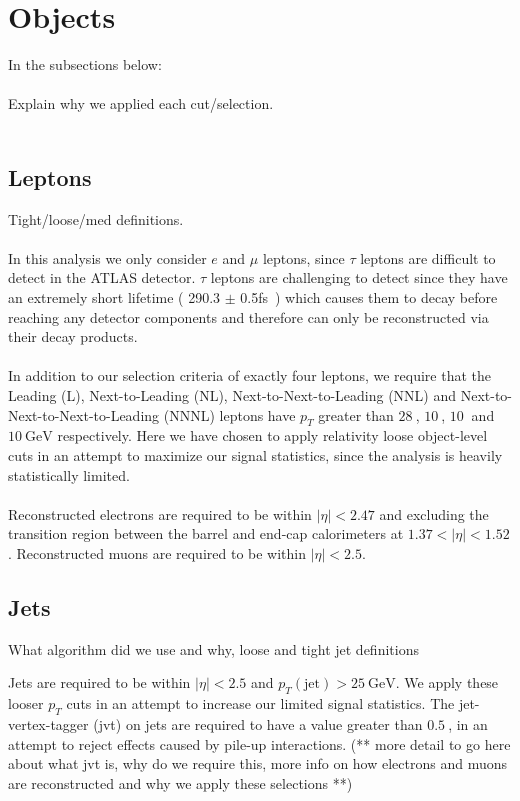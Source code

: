 \section{Objects}
In the subsections below:\\\\
Explain why we applied each cut/selection.\\\\


\subsection{Leptons}
Tight/loose/med definitions.\\\\

In this analysis we only consider $e$ and $\mu$ leptons, since $\tau$ leptons are difficult to detect in the ATLAS detector. $\tau$ leptons are challenging to detect since they have an extremely short lifetime ( 290.3 $\pm$ 0.5fs~\cite{pdg}) which causes them to decay before reaching any detector components and therefore can only be reconstructed via their decay products.\\\\
In addition to our selection criteria of exactly four leptons, we require that the Leading (L), Next-to-Leading (NL), Next-to-Next-to-Leading (NNL) and Next-to-Next-to-Next-to-Leading (NNNL) leptons have $p_{T}$ greater than $\SI{28}{}$, $\SI{10}{}$, $\SI{10}{}$ and $\SI{10}{\GeV}$ respectively. Here we have chosen to apply relativity loose object-level cuts in an attempt to maximize our signal statistics, since the analysis is heavily statistically limited.\\\\
Reconstructed electrons are required to be within $|\eta| < 2.47$ and excluding the transition region between the barrel and end-cap calorimeters at $1.37 < |\eta| < 1.52$. Reconstructed muons are required to be within $|\eta| < 2.5$.
\subsection{Jets}
What algorithm did we use and why, loose and tight jet definitions

Jets are required to be within $|\eta| < 2.5$ and $p_{T}(\text{jet}) > \SI{25}{\GeV}$. We apply these looser $p_T$ cuts in an attempt to increase our limited signal statistics. The jet-vertex-tagger (jvt) on jets are required to have a value greater than $\SI{0.5}{}$, in an attempt to reject effects caused by pile-up interactions. (** more detail to go here about what jvt is, why do we require this, more info on how electrons and muons are reconstructed and why we apply these selections **)


